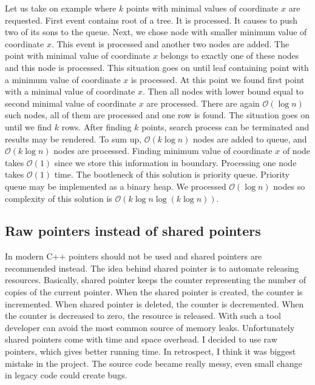 \documentclass[10pt,a4paper]{article}
\newcommand{\Oh}{\mathcal{O}}
\begin{document}
Let us take on example where $k$ points with minimal values of coordinate $x$ are requested. First event contains root of a tree. It is processed. It causes to push two of its sons to the queue. Next, we chose node with smaller minimum value of coordinate $x$. This event is processed and another two nodes are added. The point with minimal value of coordinate $x$ belongs to exactly one of these nodes and this node is processed. This situation goes on until leaf containing point with a minimum value of coordinate $x$ is processed. At this point we found first point with a minimal value of coordinate $x$. Then all nodes with lower bound equal to second minimal value of coordinate $x$ are processed. There are again $\Oh(\log n)$ such nodes, all of them are processed and one row is found. The situation goes on until we find $k$ rows.  After finding $k$ points, search process can be terminated and results may be rendered. To sum up, $\Oh(k \log n)$ nodes are added to queue, and $\Oh(k \log n)$ nodes are processed. Finding minimum value of coordinate $x$ of node takes $\Oh(1)$ since we store this information in boundary. Processing one node takes $\Oh(1)$ time. The bootleneck of this solution is priority queue. Priority queue may be implemented as a binary heap. We processed $\Oh(\log n)$ nodes so complexity of this solution is $\Oh(k \log n \log(k \log n))$.

\subsection{Raw pointers instead of shared pointers}

In modern C++ pointers should not be used and shared pointers are recommended instead. The idea behind shared pointer is to automate releasing resources. Basically, shared pointer keeps the counter representing the number of copies of the current pointer. When the shared pointer is created, the counter is incremented. When shared pointer is deleted, the counter is decremented. When the counter is decreased to zero, the resource is released. With such a tool developer can avoid the most common source of memory leaks. Unfortunately shared pointers come with time and space overhead. I decided to use raw pointers, which gives better running time. In retrospect, I think it was biggest mistake in the project. The source code became really messy, even small change in legacy code could create bugs.
\end{document}
